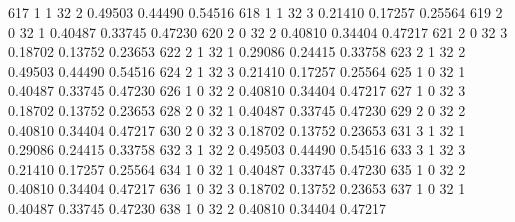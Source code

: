 \documentclass{article}
\begin{document}
\begin{Woutput}
 617      1       1      32       2       0.49503    0.44490    0.54516
 618      1       1      32       3       0.21410    0.17257    0.25564
 619      2       0      32       1       0.40487    0.33745    0.47230
 620      2       0      32       2       0.40810    0.34404    0.47217
 621      2       0      32       3       0.18702    0.13752    0.23653
 622      2       1      32       1       0.29086    0.24415    0.33758
 623      2       1      32       2       0.49503    0.44490    0.54516
 624      2       1      32       3       0.21410    0.17257    0.25564
 625      1       0      32       1       0.40487    0.33745    0.47230
 626      1       0      32       2       0.40810    0.34404    0.47217
 627      1       0      32       3       0.18702    0.13752    0.23653
 628      2       0      32       1       0.40487    0.33745    0.47230
 629      2       0      32       2       0.40810    0.34404    0.47217
 630      2       0      32       3       0.18702    0.13752    0.23653
 631      3       1      32       1       0.29086    0.24415    0.33758
 632      3       1      32       2       0.49503    0.44490    0.54516
 633      3       1      32       3       0.21410    0.17257    0.25564
 634      1       0      32       1       0.40487    0.33745    0.47230
 635      1       0      32       2       0.40810    0.34404    0.47217
 636      1       0      32       3       0.18702    0.13752    0.23653
 637      1       0      32       1       0.40487    0.33745    0.47230
 638      1       0      32       2       0.40810    0.34404    0.47217


\end{Woutput}
\end{document}
